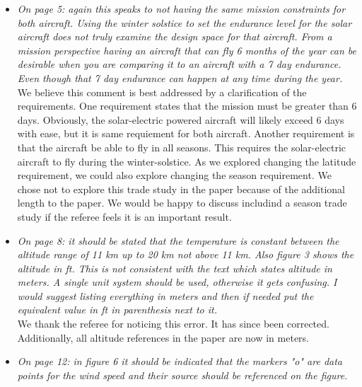 \documentclass[10pt, a4paper]{article}
\begin{document}
\begin{itemize}
    \item \emph{On page 5: again this speaks to not having the same mission constraints for both aircraft. Using the winter solstice to set the endurance level for the solar aircraft does not truly examine the design space for that aircraft. From a mission perspective having an aircraft that can fly 6 months of the year can be desirable when you are comparing it to an aircraft with a 7 day endurance. Even though that 7 day endurance can happen at any time during the year.} \\

        We believe this comment is best addressed by a clarification of the requirements.  One requirement states that the mission must be greater than 6 days.  Obviously, the solar-electric powered aircraft will likely exceed 6 days with ease, but it is same requiement for both aircraft.  Another requirement is that the aircraft be able to fly in all seasons.  This requires the solar-electric aircraft to fly during the winter-solstice.  As we explored changing the latitude requirement, we could also explore changing the season requirement.  We chose not to explore this trade study in the paper because of the additional length to the paper.  We would be happy to discuss includind a season trade study if the referee feels it is an important result. \\

    \item \emph{On page 8: it should be stated that the temperature is constant between the altitude range of 11 km up to 20 km not above 11 km. Also figure 3 shows the altitude in ft. This is not consistent with the text which states altitude in meters. A single unit system should be used, otherwise it gets confusing. I would suggest listing everything in meters and then if needed put the equivalent value in ft in parenthesis next to it.} \\

        We thank the referee for noticing this error.  It has since been corrected.  Additionally, all altitude references in the paper are now in meters.\\

    \item \emph{On page 12: in figure 6 it should be indicated that the markers "o" are data points for the wind speed and their source should be referenced on the figure.} \\


\end{itemize}
\end{document}
